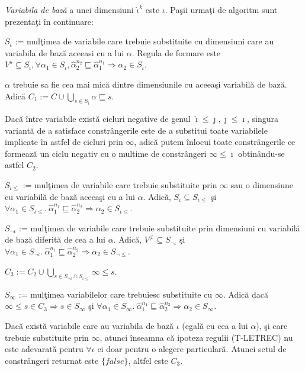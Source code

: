 \done{}
\emph{Variabila de baz\u a} a unei dimensiuni $\hat{\iota}^k$ este $\iota$. Pa\c sii urma\c ti de algoritm sunt prezenta\c ti \^ in continuare:
\begin{enumerate*}
\item $S_\iota$ := mul\c timea de variabile care trebuie substituite cu dimensiuni care au variabila de baz\u a aceeasi cu a lui $\alpha$. Regula de formare este $V^\star \subseteq S_\iota,\forall \alpha_1 \in S_\iota, \hat{\alpha}^{n_2}_2 \sqsubseteq \hat{\alpha}^{n_1}_1 \Rightarrow \alpha_2 \in S_\iota $.
\item $\alpha$ trebuie sa fie cea mai mic\u a dintre dimensiunile cu aceea\c si variabil\u a de baz\u a. Adic\u a $C_1 := C \cup \bigcup_{s\in S_i}\alpha \sqsubseteq s$.
\item Dac\u a \^ intre variabile exist\u a cicluri negative de genul $\hat{\imath} \le \jmath, \jmath \le \imath $, singura variant\u a de a satisface constr\^ angerile este de a substitui toate variabilele implicate \^ in astfel de cicluri prin $\infty$, adic\u a  putem \^ inlocui toate constr\^ angerile ce formeaz\u a un ciclu negativ cu o multime de constr\^ angeri $\infty \le \imath$ obtin\^andu-se astfel $C_2$.
\item $S_{\iota\le}$ := mul\c timea de variabile care trebuie substituite prin $\infty$ sau o dimensiune cu variabil\u a de baz\u a aceea\c si cu a lui $\alpha$. Adic\u a, $S_\iota \subseteq S_{\iota\le}$ \c si $\forall \alpha_1 \in S_{\iota\le}.\: \hat{\alpha}^{n_1}_1 \sqsubseteq \hat{\alpha}^{n_2}_2 \Rightarrow \alpha_2 \in S_{\iota\le}$.
\item $S_{\neg \iota}$ := mul\c timea de variabile care trebuie substituite prin dimensiuni cu variabil\u a de baz\u a diferit\u a de cea a lui $\alpha$. Adic\u a, $V^\neq \subseteq S_{\neg \iota}$ \c si $\forall \alpha_1 \in S_{\neg \iota}.\: \hat{\alpha}^{n_1}_1 \sqsubseteq \hat{\alpha}^{n_2}_2 \Rightarrow \alpha_2 \in S_{\neg\le}$.
\item $C_3 := C_2 \cup \bigcup_{s \in S_{\neg \iota} \cap S_{\iota\le}} \infty \le s$.
\item $S_\infty$ := mul\c timea variabilelor care trebuiesc substituite cu $\infty$. Adic\u a dac\u a $\infty\le s \in C_3 \Rightarrow s \in S_\infty$ \c si $\forall \alpha_1 \in S_\infty.\: \hat{\alpha}^{n_1}_1 \sqsubseteq \hat{\alpha}^{n_2}_2 \Rightarrow \alpha_2 \in S_\infty$.
\item Dac\u a exist\u a variabile care au variabila de baz\u a $\iota$ (egal\u a cu cea a lui $\alpha$), \c si care trebuie substituite prin $\infty$, atunci \^ inseamna c\u a ipoteza regulii {\scriptsize (T-LETREC)} nu este adevarat\u a pentru $\forall \iota$ ci doar pentru o alegere particular\u a. Atunci setul de constr\^ angeri returnat este $\{false\}$, altfel este $C_3$.
\end{enumerate*}
\done{}
